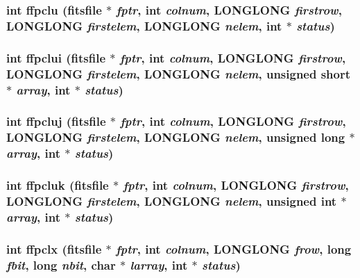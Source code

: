 \subsubsection{\setlength{\rightskip}{0pt plus 5cm}int ffpclu (\bf{fitsfile} $\ast$ {\em fptr}, int {\em colnum}, \bf{LONGLONG} {\em firstrow}, \bf{LONGLONG} {\em firstelem}, \bf{LONGLONG} {\em nelem}, int $\ast$ {\em status})}\label{fitsio__64_8h_d0b72bec18b86400b6610d40ef80e0a4}


\subsubsection{\setlength{\rightskip}{0pt plus 5cm}int ffpclui (\bf{fitsfile} $\ast$ {\em fptr}, int {\em colnum}, \bf{LONGLONG} {\em firstrow}, \bf{LONGLONG} {\em firstelem}, \bf{LONGLONG} {\em nelem}, unsigned short $\ast$ {\em array}, int $\ast$ {\em status})}\label{fitsio__64_8h_dbc957468fec6139e57ddb838f5782a7}


\subsubsection{\setlength{\rightskip}{0pt plus 5cm}int ffpcluj (\bf{fitsfile} $\ast$ {\em fptr}, int {\em colnum}, \bf{LONGLONG} {\em firstrow}, \bf{LONGLONG} {\em firstelem}, \bf{LONGLONG} {\em nelem}, unsigned long $\ast$ {\em array}, int $\ast$ {\em status})}\label{fitsio__64_8h_93be7636ae678f27fed9c25ca171c009}


\subsubsection{\setlength{\rightskip}{0pt plus 5cm}int ffpcluk (\bf{fitsfile} $\ast$ {\em fptr}, int {\em colnum}, \bf{LONGLONG} {\em firstrow}, \bf{LONGLONG} {\em firstelem}, \bf{LONGLONG} {\em nelem}, unsigned int $\ast$ {\em array}, int $\ast$ {\em status})}\label{fitsio__64_8h_b4d5611f33c75c133789ec5742f76240}


\subsubsection{\setlength{\rightskip}{0pt plus 5cm}int ffpclx (\bf{fitsfile} $\ast$ {\em fptr}, int {\em colnum}, \bf{LONGLONG} {\em frow}, long {\em fbit}, long {\em nbit}, char $\ast$ {\em larray}, int $\ast$ {\em status})}\label{fitsio__64_8h_36824bfe44a4dbdee167ea243384cab2}


